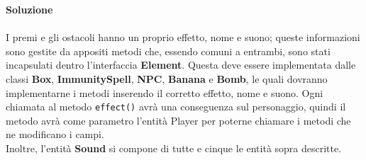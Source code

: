 \documentclass[12pt, letterpaper]{article}
\begin{document}
            \textbf{Soluzione} 
            \\ \\
            I premi e gli ostacoli hanno un proprio effetto, nome e suono; queste informazioni sono gestite da appositi metodi che, essendo comuni a entrambi, sono stati incapsulati dentro l'interfaccia \textbf{Element}. Questa deve essere implementata dalle classi \textbf{Box}, \textbf{ImmunitySpell}, \textbf{NPC}, \textbf{Banana} e \textbf{Bomb}, le quali dovranno implementarne i metodi inserendo il corretto effetto, nome e suono. Ogni chiamata al metodo \verb|effect()| avrà una conseguenza sul personaggio, quindi il metodo avrà come parametro l'entità Player per poterne chiamare i metodi che ne modificano i campi.
            \\
            Inoltre, l'entità \textbf{Sound} si compone di tutte e cinque le entità sopra descritte.
            \\
\end{document}

